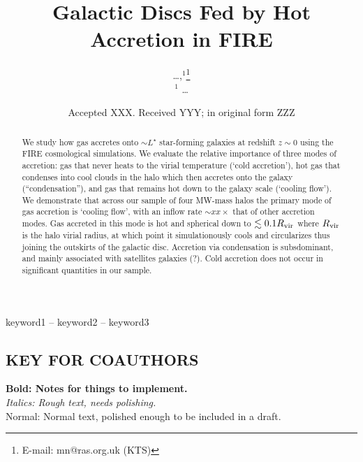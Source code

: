 \documentclass[fleqn,usenatbib]{mnras}
\title[Hot Accretion in FIRE]{Galactic Discs Fed by Hot Accretion in FIRE}
\author[\ldots]{
\ldots,$^{1}$\thanks{E-mail: mn@ras.org.uk (KTS)}
\\
$^1$ \ldots
}
\date{Accepted XXX. Received YYY; in original form ZZZ}
\newcommand{\Rvir}{R_{\rm vir}}
\begin{document}
\label{firstpage}
\pagerange{\pageref{firstpage}--\pageref{lastpage}}
\maketitle

\begin{abstract}

We study how gas accretes onto $\sim L^\star$ star-forming galaxies at redshift $z\sim0$ using the FIRE cosmological simulations. We evaluate the relative importance of three modes of accretion: gas that never heats to the virial temperature (`cold accretion'), hot gas that condenses into cool clouds in the halo which then accretes onto the galaxy (``condensation''), and gas that remains hot down to the galaxy scale (`cooling flow'). 
We demonstrate that across our sample of four MW-mass halos the primary mode of gas accretion is `cooling flow', with an inflow rate $\sim xx\times$ that of other accretion modes. Gas accreted in this mode is hot and spherical down to  $\lesssim 0.1 \Rvir$ where $\Rvir$ is the halo virial radius, at which point it simulationously cools and circularizes thus joining the outskirts of the galactic disc. 
Accretion via condensation is subsdominant, and mainly associated with satellites galaxies (?). Cold accretion does not occur in significant quantities in our sample. 
\end{abstract}

\begin{keywords}
keyword1 -- keyword2 -- keyword3
\end{keywords}



\subsection{ KEY FOR COAUTHORS}
\textbf{Bold: Notes for things to implement.} \\
\textit{Italics: Rough text, needs polishing.} \\
Normal: Normal text, polished enough to be included in a draft.
\end{document}
